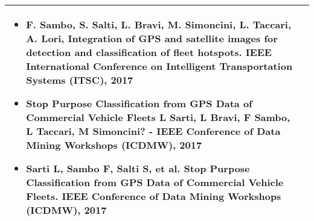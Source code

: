 \begin{center}
{\begin{tabular}{@{}p{25mm}|p{190mm}@{}}
{\begin{itemize}
\item F. Sambo, S. Salti, L. Bravi, M. Simoncini, L. Taccari, A. Lori, Integration of GPS and satellite images for detection and classification of fleet hotspots. IEEE International Conference on Intelligent Transportation Systems (ITSC), 2017

\item Stop Purpose Classification from GPS Data of Commercial Vehicle Fleets
L Sarti, L Bravi, F Sambo, L Taccari, M Simoncini? - IEEE Conference of Data Mining Workshops (ICDMW), 2017

\item Sarti  L, Sambo F, Salti S, et al.  Stop Purpose Classification from GPS Data of Commercial Vehicle Fleets.  IEEE Conference of Data Mining Workshops (ICDMW), 2017

%
\end{itemize}}\tabularnewline\bottomrule

\end{tabular}
}%
\end{center}
